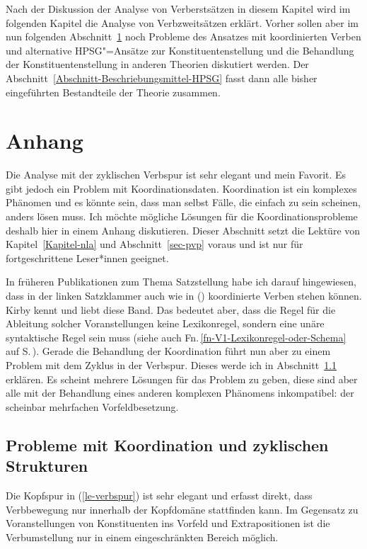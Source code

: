 \noindent
Nach der Diskussion der Analyse von Verberstsätzen in diesem Kapitel wird im folgenden Kapitel
die Analyse von Verbzweitsätzen erklärt. Vorher sollen aber im nun folgenden
Abschnitt~\ref{sec-Anhang-Verbbewegung} noch Probleme des Ansatzes mit
koordinierten Verben und alternative HPSG"=Ansätze zur Konstituentenstellung
und die Behandlung der Konstituentenstellung in anderen Theorien diskutiert werden. Der
Abschnitt~\ref{Abschnitt-Beschriebungsmittel-HPSG} fasst dann alle bisher eingeführten Bestandteile der Theorie zusammen.
\largerpage


\section{Anhang}
\label{sec-Anhang-Verbbewegung}


Die Analyse mit der zyklischen Verbspur ist sehr elegant und mein Favorit. Es gibt jedoch ein
Problem mit Koordinationsdaten. Koordination ist ein komplexes Phänomen und es könnte sein, dass man
selbst Fälle, die einfach zu sein scheinen, anders lösen muss. Ich möchte mögliche Lösungen für die
Koordinationsprobleme deshalb hier in einem Anhang diskutieren. Dieser Abschnitt setzt die Lektüre
von Kapitel~\ref{Kapitel-nla} und Abschnitt~\ref{sec-pvp} voraus und ist nur für fortgeschrittene Leser*innen geeignet.

In früheren Publikationen zum Thema Satzstellung habe ich darauf hingewiesen, dass in der linken
Satzklammer auch wie in () koordinierte Verben stehen können.
\ea
Kirby kennt und liebt diese Band.
\z
Das bedeutet aber, dass die Regel für die Ableitung solcher Voranstellungen keine Lexikonregel,
sondern eine unäre syntaktische Regel sein muss (siehe auch
Fn.\,\ref{fn-V1-Lexikonregel-oder-Schema} auf S.\,\pageref{fn-V1-Lexikonregel-oder-Schema}). Gerade
die Behandlung der Koordination führt nun aber zu einem Problem mit dem Zyklus in der
Verbspur. Dieses werde ich in Abschnitt~\ref{sec-Verbbewegung mit zyklischen Strukturen} erklären. Es scheint
mehrere Lösungen für das Problem zu geben, diese sind aber alle mit der Behandlung eines anderen
komplexen Phänomens inkompatibel: der scheinbar mehrfachen Vorfeldbesetzung.


\subsection{Probleme mit Koordination und zyklischen Strukturen}
\label{sec-Verbbewegung mit zyklischen Strukturen}

Die Kopfspur in (\ref{le-verbspur}) ist sehr elegant und erfasst direkt, dass Verbbewegung nur
innerhalb der Kopfdomäne stattfinden kann. Im Gegensatz zu Voranstellungen von Konstituenten ins Vorfeld und Extrapositionen ist
die Verbumstellung nur in einem eingeschränkten Bereich möglich.
\largerpage

